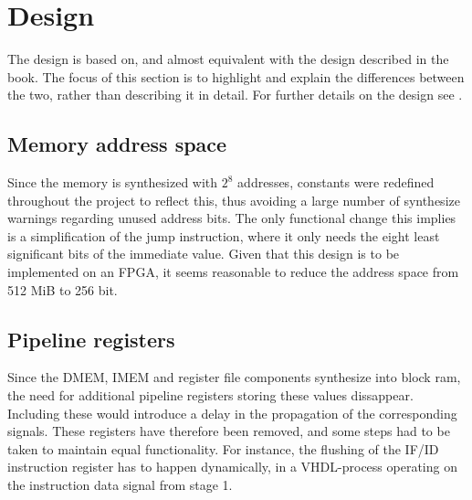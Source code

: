 \section{Design}
The design is based on, and almost equivalent with the design described in the
book. The focus of this section is to highlight and explain the differences
between the two, rather than describing it in detail. For further details on the
design see \cite{patterson12}.
\subsection{Memory address space}
Since the memory is synthesized with $2^8$ addresses, constants were redefined
throughout the project to reflect this, thus avoiding a large number of
synthesize warnings regarding unused address bits. The only functional change
this implies is a simplification of the jump instruction, where it only needs
the eight least significant bits of the immediate value. Given that this design
is to be implemented on an FPGA, it seems reasonable to reduce the address
space from 512 MiB to 256 bit.

\subsection{Pipeline registers}
Since the DMEM, IMEM and register file components synthesize into block ram, the
need for additional pipeline registers storing these values dissappear.
Including these would introduce a delay in the propagation of the corresponding
signals. These registers have therefore been removed, and some steps had to be
taken to maintain equal functionality. For instance, the flushing of the IF/ID
instruction register has to happen dynamically, in a VHDL-process operating on
the instruction data signal from stage 1.